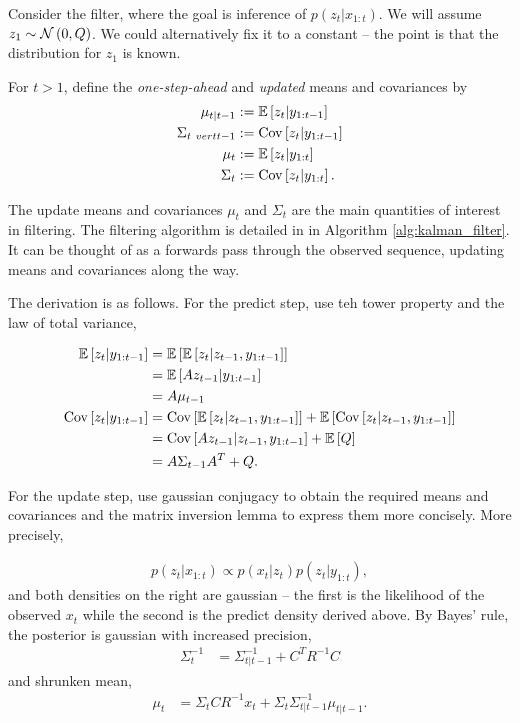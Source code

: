 \documentclass{article}
\begin{document}
Consider the filter, where the goal is inference of $p\left(z_{t} \vert
x_{1:t}\right)$. We will assume $z_{1} \sim \mathcal{N}\left(0, Q\right)$. We
could alternatively fix it to a constant -- the point is that the distribution
for $z_{1}$ is known.

For $t > 1$, define the \textit{one-step-ahead} and \textit{updated} means and
covariances by
\begin{align*}
  \mu_{t \vert t - 1} &:= \mathbb{E}\left[{z_{t} \vert y_{1:t - 1}}\right] \\
  \Sigma_{t \ vert t - 1} &:= \mathrm{Cov}\left[{z_{t} \vert y_{1:t - 1}}\right] \\
  \mu_{t} &:= \mathbb{E}\left[{z_{t} \vert y_{1:t}}\right] \\
  \Sigma_{t} &:= \mathrm{Cov}\left[{z_{t} \vert y_{1:t}}\right].
\end{align*}

The update means and covariances $\mu_{t}$ and $\Sigma_{t}$ are the main
quantities of interest in filtering. The filtering algorithm is detailed in in
Algorithm \ref{alg:kalman_filter}. It can be thought of as a forwards pass
through the observed sequence, updating means and covariances along the way.

The derivation is as follows. For the predict step, use teh tower property and
the law of total variance,

\begin{align*}
  \mathbb{E}\left[{z_{t} \vert y_{1:t - 1}}\right] &= \mathbb{E}\left[{\mathbb{E}\left[{z_{t} \vert z_{t - 1}, y_{1:t - 1}}\right]}\right] \\
  & = \mathbb{E}\left[{Az_{t - 1}\vert y_{1:t - 1}}\right] \\
  &= A\mu_{t - 1} \\
  \mathrm{Cov}\left[{z_{t} \vert y_{1:t - 1}}\right] &= \mathrm{Cov}\left[{\mathbb{E}\left[{z_{t} \vert z_{t - 1}, y_{1:t - 1}}\right]}\right] + \mathbb{E}\left[{\mathrm{Cov}\left[{z_{t} \vert z_{t - 1}, y_{1:t - 1}}\right]}\right] \\
  &= \mathrm{Cov}\left[{Az_{t - 1} \vert z_{t - 1}, y_{1:t - 1}}\right] + \mathbb{E}\left[{Q}\right] \\
  &= A\Sigma_{t - 1}A^{T} + Q.
\end{align*}

For the update step, use gaussian conjugacy to obtain the required means and
covariances and the matrix inversion lemma to express them more concisely.
More precisely,

\begin{align*}
p\left(z_{t} \vert x_{1:t}\right) \propto p\left(x_{t} \vert z_{t}\right)p\left(z_{t} \vert y_{1:t}\right),
\end{align*}
and both densities on the right are gaussian -- the first is the likelihood of
the observed $x_{t}$ while the second is the predict density derived above. By
Bayes' rule, the posterior is gaussian with increased precision,
\begin{align}
  \label{eq:sigma_t_inv}
\Sigma_{t}^{-1} &= \Sigma_{t \vert t - 1}^{-1} + C^{T}R^{-1}C
\end{align}
and shrunken mean,
\begin{align}
  \label{eq:mu_t}
\mu_{t} &= \Sigma_{t}CR^{-1}x_{t} + \Sigma_{t}\Sigma_{t \vert t - 1}^{-1} \mu_{t \vert t - 1}.
\end{align}
\end{document}
